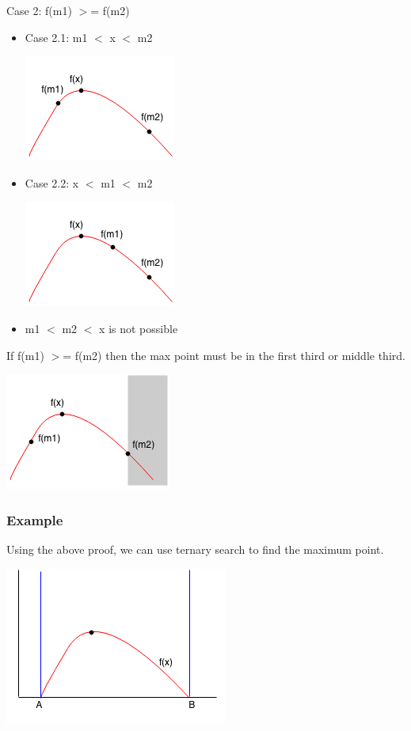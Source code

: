 \documentclass[11pt,oneside]{book}
\makeatletter
\def\maxwidth#1{\ifdim\Gin@nat@width>#1 #1\else\Gin@nat@width\fi}
\makeatother
\begin{document}
Case 2: f(m1) $>$= f(m2)

\begin{itemize}
\item Case 2.1: m1 $<$ x $<$ m2

\vspace{5px}\includegraphics[width=\maxwidth{\textwidth}]{ternarycase21.png}
\item Case 2.2: x $<$ m1 $<$ m2

\vspace{5px}\includegraphics[width=\maxwidth{\textwidth}]{ternarycase22.png}
\item m1 $<$ m2 $<$ x is not possible
\end{itemize}

If f(m1) $>$= f(m2) then the max point must be in the first third or middle third.

\vspace{5px}\includegraphics[width=\maxwidth{\textwidth}]{ternarycase2.png}

\subsubsection{Example}

Using the above proof, we can use ternary search to find the maximum point.

\vspace{5px}\includegraphics[width=\maxwidth{\textwidth}]{ternarysearch.png}
\end{document}
